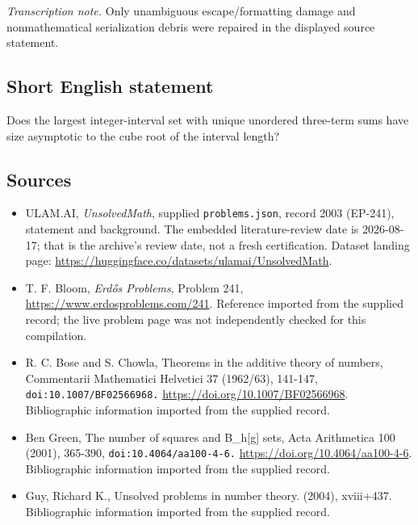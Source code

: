 \documentclass[11pt,a4paper]{article}
\begin{document}
{\small\emph{Transcription note.} Only unambiguous escape/formatting damage and nonmathematical serialization debris were repaired in the displayed source statement.}

\subsection{Short English statement}

Does the largest integer-interval set with unique unordered three-term sums have size asymptotic to the cube root of the interval length?

\subsection{Sources}

{\small

\begin{itemize}

\item[\hypertarget{source:2003:1}{S1}] ULAM.AI, \emph{UnsolvedMath}, supplied \texttt{problems.json}, record 2003 (EP-241), statement and background. The embedded literature-review date is 2026-08-17; that is the archive’s review date, not a fresh certification. Dataset landing page: \url{https://huggingface.co/datasets/ulamai/UnsolvedMath}.

\item[\hypertarget{source:2003:2}{S2}] T. F. Bloom, \emph{Erdős Problems}, Problem 241, \url{https://www.erdosproblems.com/241}. Reference imported from the supplied record; the live problem page was not independently checked for this compilation.

\item[\hypertarget{source:2003:3}{S3}] R. C. Bose and S. Chowla, Theorems in the additive theory of numbers, Commentarii Mathematici Helvetici 37 (1962/63), 141-147, \nolinkurl{doi:10.1007/BF02566968.} \url{https://doi.org/10.1007/BF02566968}. Bibliographic information imported from the supplied record.

\item[\hypertarget{source:2003:4}{S4}] Ben Green, The number of squares and B\_h[g] sets, Acta Arithmetica 100 (2001), 365-390, \nolinkurl{doi:10.4064/aa100-4-6.} \url{https://doi.org/10.4064/aa100-4-6}. Bibliographic information imported from the supplied record.

\item[\hypertarget{source:2003:5}{S5}] Guy, Richard K., Unsolved problems in number theory. (2004), xviii+437. Bibliographic information imported from the supplied record.

\end{itemize}

}

\label{end:2003}
\end{document}
